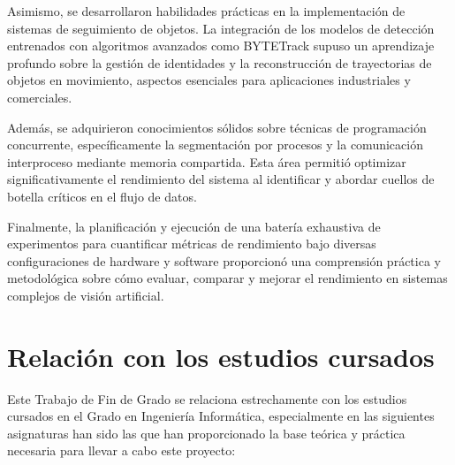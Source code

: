\documentclass[11pt,spanish,listoffigures,listoftables]{tfgetsinf}
\begin{document}
Asimismo, se desarrollaron habilidades prácticas en la implementación de sistemas de seguimiento de objetos. La integración de los modelos de detección entrenados con algoritmos avanzados como BYTETrack supuso un aprendizaje profundo sobre la gestión de identidades y la reconstrucción de trayectorias de objetos en movimiento, aspectos esenciales para aplicaciones industriales y comerciales.

Además, se adquirieron conocimientos sólidos sobre técnicas de programación concurrente, específicamente la segmentación por procesos y la comunicación interproceso mediante memoria compartida. Esta área permitió optimizar significativamente el rendimiento del sistema al identificar y abordar cuellos de botella críticos en el flujo de datos.

Finalmente, la planificación y ejecución de una batería exhaustiva de experimentos para cuantificar métricas de rendimiento bajo diversas configuraciones de hardware y software proporcionó una comprensión práctica y metodológica sobre cómo evaluar, comparar y mejorar el rendimiento en sistemas complejos de visión artificial.


\section{Relación con los estudios cursados}

Este Trabajo de Fin de Grado se relaciona estrechamente con los estudios cursados en el Grado en Ingeniería Informática, especialmente en las siguientes asignaturas han sido las que han proporcionado la base teórica y práctica necesaria para llevar a cabo este proyecto:
\end{document}
